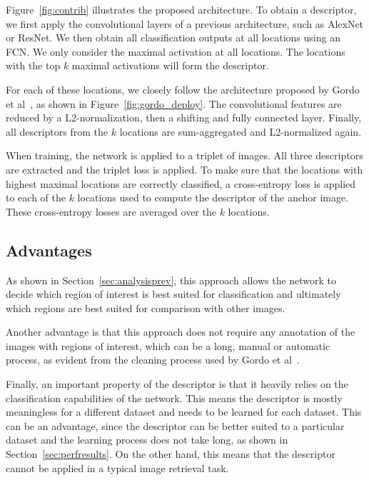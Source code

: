 Figure~\ref{fig:contrib} illustrates the proposed architecture.
To obtain a descriptor, we first apply the convolutional layers of
a previous architecture, such as AlexNet or ResNet. We then obtain all
classification outputs at all locations using an FCN. We only consider the
maximal activation at all locations. The locations with the
top $k$ maximal activations will form the descriptor.

For each of these locations, we closely follow the architecture
proposed by Gordo et al~\cite{gordo_deep_2016}, as shown in
Figure~\ref{fig:gordo_deploy}. The convolutional features are
reduced by a L2-normalization, then a shifting and fully connected
layer. Finally, all descriptors from the $k$ locations are
sum-aggregated and L2-normalized again.

When training, the network is applied to a triplet of images.
All three descriptors are extracted and the triplet loss is
applied. To make sure that the locations with highest
maximal locations are correctly classified, a
cross-entropy loss is applied to each of the $k$ locations
used to compute the descriptor of the anchor image.
These cross-entropy losses are averaged over the $k$
locations.

\subsection{Advantages}
As shown in Section~\ref{sec:analysisprev}, this approach
allows the network to decide which region of interest is
best suited for classification and ultimately which regions
are best suited for comparison with other images.

Another advantage is that this approach does not require
any annotation of the images with regions of interest,
which can be a long, manual or automatic process, as evident
from the cleaning process used by Gordo et al~\cite{gordo_end--end_2016}.

Finally, an important property of the descriptor is that it
heavily relies on the classification
capabilities of the network. This means the descriptor is
mostly meaningless for a different dataset and needs
to be learned for each dataset. This can be an advantage,
since the descriptor can be better suited to a particular
dataset and the learning process does not take long, as shown
in Section~\ref{sec:perfresults}. On the other hand, this means that
the descriptor cannot be applied in a typical image retrieval
task.
